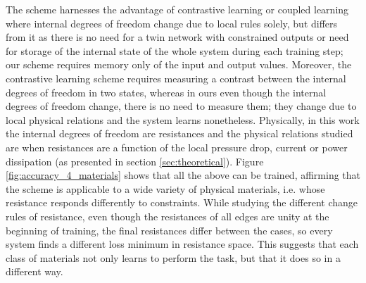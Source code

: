 \documentclass[%
 reprint,
 amsmath,amssymb,
 aps,
]{revtex4-2}
\begin{document}
    The scheme harnesses the advantage of contrastive learning \cite{scellier2017equilibrium} or coupled learning \cite{stern2021supervised} where internal degrees of freedom change due to local rules solely, but differs from it as there is no need for a twin network with constrained outputs or need for storage of the internal state of the whole system during each training step; our scheme requires memory only of the input and output values. 
    Moreover, the contrastive learning scheme requires measuring a contrast between the internal degrees of freedom in two states, whereas in ours even though the internal degrees of freedom change, there is no need to measure them; they change due to local physical relations and the system learns nonetheless. 
    Physically, in this work the internal degrees of freedom are resistances and the physical relations studied are when resistances are a function of the local pressure drop, current or power dissipation (as presented in section \ref{sec:theoretical}). 
    Figure \ref{fig:accuracy_4_materials} shows that all the above can be trained, affirming that the scheme is applicable to a wide variety of physical materials, i.e. whose resistance responds differently to constraints. While studying the different change rules of resistance, even though the resistances of all edges are unity at the beginning of training, the final resistances differ between the cases, so every system finds a different loss minimum in resistance space. This suggests that each class of materials not only learns to perform the task, but that it does so in a different way.
\end{document}
